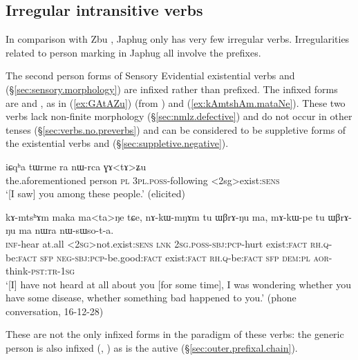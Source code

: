 \subsection{Irregular intransitive verbs} \label{sec:intr.person.irregular}
In comparison with Zbu \citep{gong18these}, Japhug only has very few irregular verbs. Irregularities related to person marking in Japhug all involve the prefixes.

The second person forms of Sensory Evidential existential verbs  and  (§\ref{sec:sensory.morphology}) are infixed rather than prefixed. The infixed forms are  and , as in (\ref{ex:GAtAZu}) (from \citealt[91]{jacques12agreement}) and  (\ref{ex:kAmtshAm.mataNe}). These two verbs lack non-finite morphology (§\ref{sec:nmlz.defective}) and do not occur in other tenses (§\ref{sec:verbs.no.preverbs}) and can be considered to be suppletive forms of the existential verbs  and  (§\ref{sec:suppletive.negative}).

\begin{exe}
\ex \label{ex:GAtAZu}
\gll iɕqʰa tɯrme ra nɯ-rca ɣɤ<tɤ>ʑu \\
the.aforementioned person \textsc{pl} \textsc{3pl}.\textsc{poss}-following <2sg>exist:\textsc{sens} \\
\glt `[I saw] you among these people.' (elicited)
\end{exe}

\begin{exe}
\ex \label{ex:kAmtshAm.mataNe}
\gll kɤ-mtsʰɤm maka ma<ta>ŋe tɕe, nɤ-kɯ-mŋɤm tu ɯβrɤ-ŋu ma, mɤ-kɯ-pe tu ɯβrɤ-ŋu ma nɯra nɯ-sɯso-t-a. \\
\textsc{inf}-hear at.all <\textsc{2sg}>not.exist:\textsc{sens} \textsc{lnk} \textsc{2sg}.\textsc{poss}-\textsc{sbj}:\textsc{pcp}-hurt exist:\textsc{fact} \textsc{rh}.\textsc{q}-be:\textsc{fact} \textsc{sfp}  \textsc{neg}-\textsc{sbj}:\textsc{pcp}-be.good:\textsc{fact} exist:\textsc{fact} \textsc{rh}.\textsc{q}-be:\textsc{fact} \textsc{sfp} \textsc{dem}:\textsc{pl} \textsc{aor}-think-\textsc{pst}:\textsc{tr}-\textsc{1sg} \\
\glt `[I] have not heard at all about you [for some time], I was wondering whether you have some disease, whether something bad happened to you.' (phone conversation, 16-12-28)
\end{exe}

These are not the only infixed forms in the paradigm of these verbs: the generic person  is also infixed (, ) as is the autive  (§\ref{sec:outer.prefixal.chain}).


